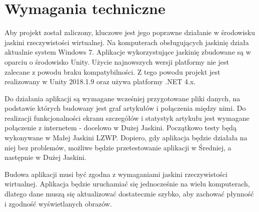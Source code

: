 \section{Wymagania techniczne}
Aby projekt został zaliczony, kluczowe jest jego poprawne działanie w środowisku jaskini rzeczywistości wirtualnej. Na komputerach obsługujących jaskinię działa aktualnie system Windows 7. Aplikacje wykorzystujące jaskinię zbudowane są w oparciu o środowisko Unity. Użycie najnowszych wersji platformy nie jest zalecane z powodu braku kompatybilności. Z tego powodu projekt jest realizowany w Unity 2018.1.9 oraz używa platformy .NET 4.x.

Do działania aplikacji są wymagane wcześniej przygotowane pliki danych, na podstawie których budowany jest graf artykułów i połączenia między nimi. Do realizacji funkcjonalności ekranu szczegółów i statystyk artykułu jest wymagane połączenie z internetem - docelowo w Dużej Jaskini. Początkowo testy będą wykonywane w Małej Jaskini LZWP. Dopiero, gdy aplikacja będzie działała na niej bez problemów, możliwe będzie przetestowanie aplikacji w Średniej, a następnie w Dużej Jaskini.

Budowa aplikacji musi być zgodna z wymaganiami jaskini rzeczywistości wirtualnej. Aplikacja będzie uruchamiać się jednocześnie na wielu komputerach, dlatego dane muszą się aktualizować dostatecznie szybko, aby zachować płynność i zgodność wyświetlanych obrazów.
\newpage